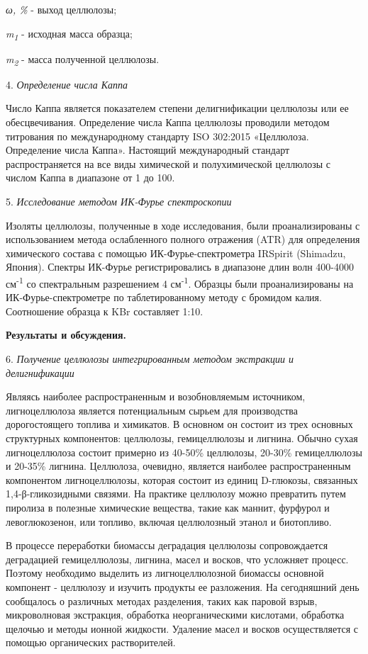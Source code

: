 \begin{multicols}{2}
\emph{ω, \%} - выход целлюлозы;

\emph{m\textsubscript{1}} - исходная масса образца;

\emph{m\textsubscript{2}} - масса полученной целлюлозы.

4. \emph{Определение числа Каппа}

Число Каппа является показателем степени делигнификации целлюлозы или ее
обесцвечивания. Определение числа Каппа целлюлозы проводили методом
титрования по международному стандарту ISO 302:2015 «Целлюлоза.
Определение числа Каппа». Настоящий международный стандарт
распространяется на все виды химической и полухимической целлюлозы с
числом Каппа в диапазоне от 1 до 100.

5. \emph{Исследование методом ИК-Фурье спектроскопии}

Изоляты целлюлозы, полученные в ходе исследования, были проанализированы
с использованием метода ослабленного полного отражения (ATR) для
определения химического состава с помощью ИК-Фурье-спектрометра IRSpirit
(Shimadzu, Япония). Спектры ИК-Фурье регистрировались в диапазоне длин
волн 400-4000 см\textsuperscript{-1} со спектральным разрешением 4
см\textsuperscript{-1}. Образцы были проанализированы на
ИК-Фурье-спектрометре по таблетированному методу с бромидом калия.
Соотношение образца к KBr составляет 1:10.

{\bfseries Результаты и обсуждения.}

6. \emph{Получение целлюлозы интегрированным методом экстракции и делигнификации}

Являясь наиболее распространенным и возобновляемым источником,
лигноцеллюлоза является потенциальным сырьем для производства
дорогостоящего топлива и химикатов. В основном он состоит из трех
основных структурных компонентов: целлюлозы, гемицеллюлозы и лигнина.
Обычно сухая лигноцеллюлоза состоит примерно из 40-50\% целлюлозы,
20-30\% гемицеллюлозы и 20-35\% лигнина. Целлюлоза, очевидно, является
наиболее распространенным компонентом лигноцеллюлозы, которая состоит из
единиц D-глюкозы, связанных 1,4-β-гликозидными связями. На практике
целлюлозу можно превратить путем пиролиза в полезные химические
вещества, такие как маннит, фурфурол и левоглюкозенон, или топливо,
включая целлюлозный этанол и биотопливо.

В процессе переработки биомассы деградация целлюлозы сопровождается
деградацией гемицеллюлозы, лигнина, масел и восков, что усложняет
процесс. Поэтому необходимо выделить из лигноцеллюлозной биомассы
основной компонент - целлюлозу и изучить продукты ее разложения. На
сегодняшний день сообщалось о различных методах разделения, таких как
паровой взрыв, микроволновая экстракция, обработка неорганическими
кислотами, обработка щелочью и методы ионной жидкости. Удаление масел и
восков осуществляется с помощью органических растворителей.


\end{multicols}
